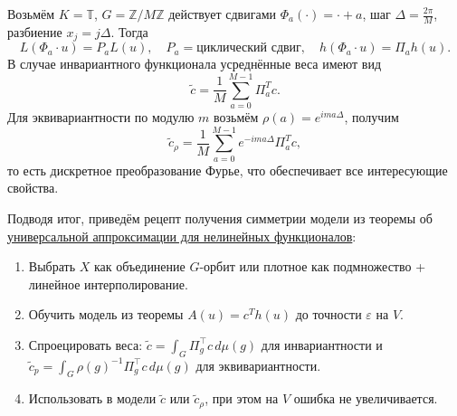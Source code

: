 \documentclass[../NDCNNAI_main.tex]{subfiles}
\begin{document}
\begin{example}
  Возьмём $K = \mathbb{T}$, $G = \mathbb{Z}/M\mathbb{Z}$ действует сдвигами $\Phi_a(\cdot) = \cdot + a$, шаг $\Delta = \frac{2\pi}{M}$, разбиение $x_j = j\Delta$.
  Тогда
  $$L(\Phi_a \cdot u) = P_a L(u), \quad P_a = \mbox{циклический сдвиг}, \quad h(\Phi_a \cdot u) = \Pi_a h(u).$$
  В случае инвариантного функционала усреднённые веса имеют вид
  $$\widetilde{c} = \frac{1}{M} \sum_{a=0}^{M-1} \Pi_a^T c.$$
  Для эквивариантности по модулю $m$ возьмём $\rho(a) = e^{ima\Delta}$, получим
  $$\widetilde{c}_\rho = \frac{1}{M} \sum_{a=0}^{M-1} e^{-ima\Delta} \Pi_a^T c,$$
  то есть дискретное преобразование Фурье, что обеспечивает все интересующие свойства.
\end{example}
Подводя итог, приведём рецепт получения симметрии модели из теоремы об \hyperref[thm:uat_nonlin]{универсальной аппроксимации для нелинейных функционалов}:
\begin{enumerate}
  \item Выбрать $X$ как объединение $G$-орбит или плотное как подмножество + линейное интерполирование.
  \item Обучить модель из теоремы $A(u) = c^T h(u)$ до точности $\varepsilon$ на $V$.
  \item Спроецировать веса: $\tilde{c} = \int_G \Pi_g^\top c \, d\mu(g)$ для инвариантности и $\tilde{c}_p = \int_G \rho(g)^{-1} \Pi_g^\top c \, d\mu(g)$ для эквивариантности.
  \item Использовать в модели $\tilde{c}$ или $\tilde{c}_\rho$, при этом на $V$ ошибка не увеличивается.
\end{enumerate}
\end{document}
